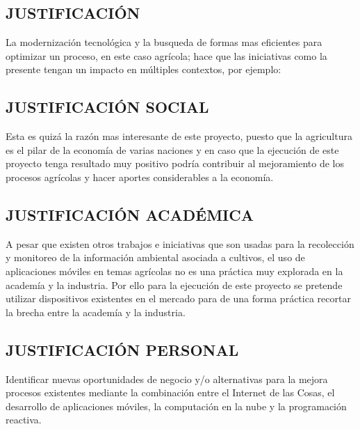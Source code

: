 \begin{center}
\section{JUSTIFICACI\'ON}
\end{center}

\noindent La modernizaci\'on tecnol\'ogica y la busqueda de formas mas eficientes para optimizar un proceso, en este caso agr\'icola; hace que las iniciativas como la presente tengan un impacto en m\'ultiples contextos, por ejemplo:\\

\subsection{JUSTIFICACI\'ON SOCIAL}

\noindent Esta es quiz\'a la raz\'on mas interesante de este proyecto, puesto que la agricultura es el pilar de la econom\'ia de varias naciones \cite{IoTBasedSmartAgriculture2016} y en caso que la ejecuci\'on de este proyecto tenga resultado muy positivo podr\'ia contribuir al mejoramiento de los procesos agr\'icolas y hacer aportes considerables a la econom\'ia.\\

\subsection{JUSTIFICACI\'ON ACAD\'EMICA}

\noindent A pesar que existen otros trabajos e iniciativas que son usadas para la recolecci\'on y monitoreo de la informaci\'on ambiental asociada a cultivos, el uso de aplicaciones m\'oviles en temas agr\'icolas no es una pr\'actica muy explorada en la academ\'ia y la industria. Por ello para la ejecuci\'on de este proyecto se pretende utilizar dispositivos existentes en el mercado para de una forma pr\'actica recortar la brecha entre la academ\'ia y la industria.\\

\subsection{JUSTIFICACI\'ON PERSONAL}

\noindent Identificar nuevas oportunidades de negocio y/o alternativas para la mejora procesos existentes mediante la combinaci\'on entre el Internet de las Cosas, el desarrollo de aplicaciones m\'oviles, la computaci\'on en la nube y la programaci\'on reactiva.



